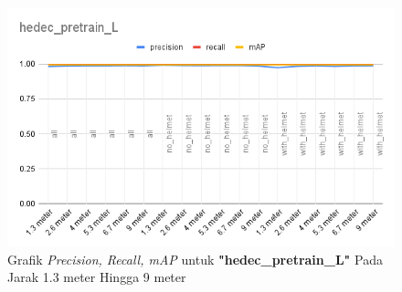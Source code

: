 \begin{enumerate}
  \begin{figure} [h!]
    \centering
    \includegraphics[width=1\textwidth]{gambar/BerdasarkanJarak/hedec_pretrain_L.png}
    \caption{Grafik \emph{Precision, Recall, mAP} untuk \textbf{"hedec\_pretrain\_L"} Pada Jarak 1.3 meter Hingga 9 meter}
    \label{fig:grafvaljarak_hedec_pretrain_L}  
  \end{figure}


\end{enumerate}
